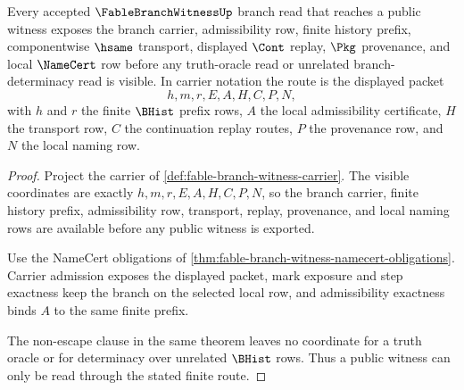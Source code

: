\begin{theorem}
\label{thm:fablebranchwitness-formal-target-route}
Every accepted $\FableBranchWitnessUp$ branch read that reaches a public witness exposes the branch carrier, admissibility row, finite history prefix, componentwise $\hsame$ transport, displayed $\Cont$ replay, $\Pkg$ provenance, and local $\NameCert$ row before any truth-oracle read or unrelated branch-determinacy read is visible. In carrier notation the route is the displayed packet
$$
h,m,r,E,A,H,C,P,N,
$$
with $h$ and $r$ the finite $\BHist$ prefix rows, $A$ the local admissibility certificate, $H$ the transport row, $C$ the continuation replay routes, $P$ the provenance row, and $N$ the local naming row.
\end{theorem}
\begin{proof}
Project the carrier of \autoref{def:fable-branch-witness-carrier}. The visible coordinates are exactly $h,m,r,E,A,H,C,P,N$, so the branch carrier, finite history prefix, admissibility row, transport, replay, provenance, and local naming rows are available before any public witness is exported.

Use the NameCert obligations of \autoref{thm:fable-branch-witness-namecert-obligations}. Carrier admission exposes the displayed packet, mark exposure and step exactness keep the branch on the selected local row, and admissibility exactness binds $A$ to the same finite prefix.

The non-escape clause in the same theorem leaves no coordinate for a truth oracle or for determinacy over unrelated $\BHist$ rows. Thus a public witness can only be read through the stated finite route.
\end{proof}

